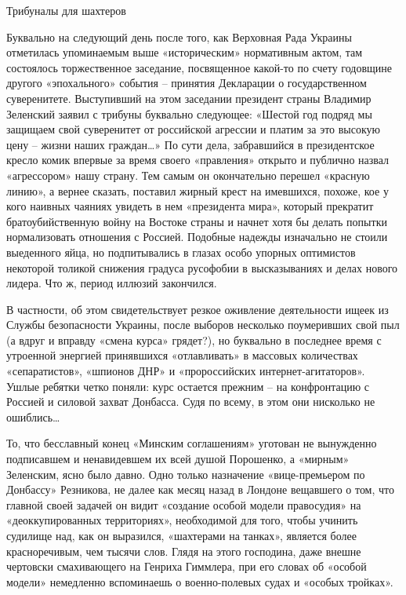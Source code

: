Трибуналы для шахтеров

Буквально на следующий день после того, как Верховная Рада Украины отметилась
упоминаемым выше «историческим» нормативным актом, там состоялось торжественное
заседание, посвященное какой-то по счету годовщине другого «эпохального»
события – принятия Декларации о государственном суверенитете. Выступивший на
этом заседании президент страны Владимир Зеленский заявил с трибуны буквально
следующее: «Шестой год подряд мы защищаем свой суверенитет от российской
агрессии и платим за это высокую цену – жизни наших граждан…» По сути дела,
забравшийся в президентское кресло комик впервые за время своего «правления»
открыто и публично назвал «агрессором» нашу страну. Тем самым он окончательно
перешел «красную линию», а вернее сказать, поставил жирный крест на имевшихся,
похоже, кое у кого наивных чаяниях увидеть в нем «президента мира», который
прекратит братоубийственную войну на Востоке страны и начнет хотя бы делать
попытки нормализовать отношения с Россией. Подобные надежды изначально не
стоили выеденного яйца, но подпитывались в глазах особо упорных оптимистов
некоторой толикой снижения градуса русофобии в высказываниях и делах нового
лидера. Что ж, период иллюзий закончился.

В частности, об этом свидетельствует резкое оживление деятельности ищеек из
Службы безопасности Украины, после выборов несколько поумеривших свой пыл (а
вдруг и вправду «смена курса» грядет?), но буквально в последнее время с
утроенной энергией принявшихся «отлавливать» в массовых количествах
«сепаратистов», «шпионов ДНР» и «пророссийских интернет-агитаторов». Ушлые
ребятки четко поняли: курс остается прежним – на конфронтацию с Россией и
силовой захват Донбасса. Судя по всему, в этом они нисколько не ошиблись…

То, что бесславный конец «Минским соглашениям» уготован не вынужденно
подписавшем и ненавидевшем их всей душой Порошенко, а «мирным» Зеленским, ясно
было давно. Одно только назначение «вице-премьером по Донбассу» Резникова, не
далее как месяц назад в Лондоне вещавшего о том, что главной своей задачей он
видит «создание особой модели правосудия» на «деоккупированных территориях»,
необходимой для того, чтобы учинить судилище над, как он выразился, «шахтерами
на танках», является более красноречивым, чем тысячи слов. Глядя на этого
господина, даже внешне чертовски смахивающего на Генриха Гиммлера, при его
словах об «особой модели» немедленно вспоминаешь о военно-полевых судах и
«особых тройках».

